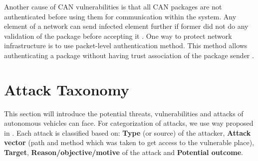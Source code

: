 \begin{enumerate}
	Another cause of \gls{CAN} vulnerabilities is that all \gls{CAN} packages are not authenticated before using them for communication within the system. Any element of a network can send infected element further if former did not do any validation of the package before accepting it \cite{secanalysis}.
	One way to protect network infrastructure is to use packet-level authentication method. This method allows authenticating a package without having trust association of the package sender \cite{pla}.
\end{enumerate}

\section{Attack Taxonomy}

This section will introduce the potential threats, vulnerabilities
and attacks of autonomous vehicles can face. For categorization of attacks, we use way proposed in \cite{sec}. Each attack is classified based on: \textbf{Type} (or source) of the attacker, \textbf{Attack vector} (path and method which was taken to get access to the vulnerable place), \textbf{Target}, \textbf{Reason/objective/motive} of the attack and \textbf{Potential outcome}.

